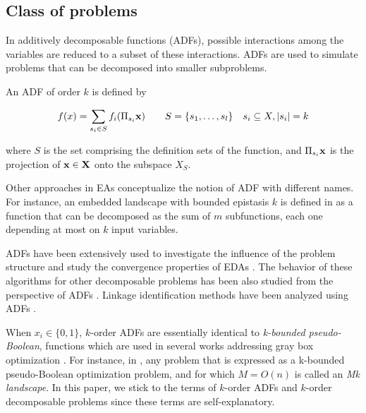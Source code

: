 \documentclass{article} %
\begin{document}
\subsection{Class of problems}

 

In additively decomposable functions (ADFs), possible interactions among the variables are reduced to a subset of these interactions. ADFs are used to simulate problems that can be decomposed into smaller subproblems. 
 
\begin{definition} 
  An ADF of order $k$ is  defined by 
 
 \begin{equation} 
   f(x)=\sum_{s_i\in S}f_i(\Pi _{s_i}{\bf{x}})\qquad S=\{s_1,\dots ,s_l\}\quad 
   s_i\subseteq X, |s_i| = k 
\end{equation} 
\end{definition} 
where $S$ is the set comprising the definition sets of the function, and $\Pi _{s_i}{\bf{x}}$ is the projection of ${\bf{x}} \in {\bf{X}}$ onto the subspace $X_S$. 

Other approaches in EAs conceptualize the notion of ADF with different names. For instance, an embedded landscape with bounded epistasis $k$ is defined in  \cite{Heckendorn:2002}  as a function that can be decomposed  as the sum of $m$ subfunctions, each one depending at most on $k$ input variables.

ADFs have been extensively used to investigate the influence of the  problem structure and study the convergence properties of EDAs \cite{Brownlee_et_al:2012a,Echegoyen_et_al:2011,Muhlenbein_and_Mahnig:1999,Pelikan_and_Hauschild:2012a,Zhang:2004}. The behavior of these algorithms for other decomposable problems has been also studied from the perspective of ADFs \cite{Grahl_et_al:2008a,Sastry_et_al:2005a}. Linkage identification methods have been analyzed using ADFs \cite{Chen_et_al:2012,Chuang_and_Chen:2007,Rohlfshagen_and_Bullinaria:2008,Tsuji_et_al:2007,Zhou_et_al:2008}. 

When $x_i \in \{0,1\}$,  $k$-order ADFs are essentially identical to \emph{k-bounded pseudo-Boolean}, functions which are used in several works addressing gray box optimization \cite{Chicano_et_2014,Whitley:2015,Whitley_et_al:2016}. For instance, in  \cite{Whitley:2015},  any problem that is expressed as a k-bounded pseudo-Boolean optimization problem, and for which $M=O(n)$  is called an \emph{Mk landscape}. 
In this paper, we stick to the terms of $k$-order ADFs and $k$-order decomposable problems since these terms are self-explanatory.
\end{document}
